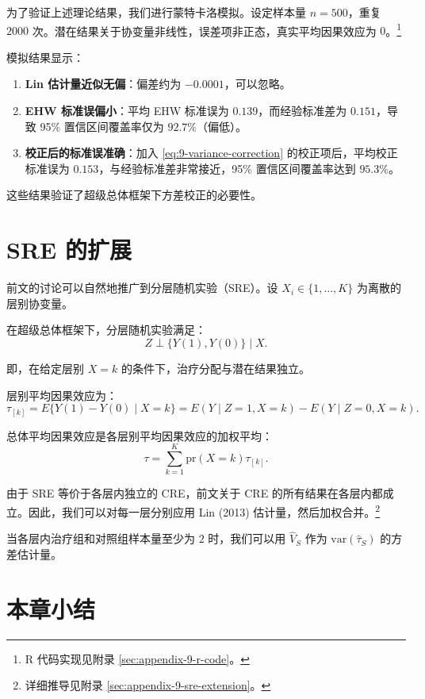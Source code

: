 为了验证上述理论结果，我们进行蒙特卡洛模拟。设定样本量 $n=500$，重复 $2000$ 次。潜在结果关于协变量非线性，误差项非正态，真实平均因果效应为 $0$。\footnote{R 代码实现见附录 \cref{sec:appendix-9-r-code}。}

模拟结果显示：
\begin{enumerate}
  \item \textbf{Lin 估计量近似无偏}：偏差约为 $-0.0001$，可以忽略。
  \item \textbf{EHW 标准误偏小}：平均 EHW 标准误为 $0.139$，而经验标准差为 $0.151$，导致 95\% 置信区间覆盖率仅为 $92.7\%$（偏低）。
  \item \textbf{校正后的标准误准确}：加入 \cref{eq:9-variance-correction} 的校正项后，平均校正标准误为 $0.153$，与经验标准差非常接近，95\% 置信区间覆盖率达到 $95.3\%$。
\end{enumerate}

这些结果验证了超级总体框架下方差校正的必要性。

\section{SRE 的扩展}\label{sec:9-sre-extension}

前文的讨论可以自然地推广到分层随机实验（SRE）。设 $X_i \in \{1, \dots, K\}$ 为离散的层别协变量。

\begin{Definition}\label{def:9-sre-superpop}
在超级总体框架下，分层随机实验满足：
\[
Z \perp \{Y(1), Y(0)\} \mid X.
\label{eq:9-sre-randomization}
\]
\end{Definition}

即，在给定层别 $X=k$ 的条件下，治疗分配与潜在结果独立。

层别平均因果效应为：
\[
\tau_{[k]} = E\{Y(1) - Y(0) \mid X=k\} = E(Y \mid Z=1, X=k) - E(Y \mid Z=0, X=k).
\label{eq:9-stratum-ace}
\]

总体平均因果效应是各层别平均因果效应的加权平均：
\[
\tau = \sum_{k=1}^K \mathrm{pr}(X=k) \tau_{[k]}.
\label{eq:9-total-ace-weighted}
\]

由于 SRE 等价于各层内独立的 CRE，前文关于 CRE 的所有结果在各层内都成立。因此，我们可以对每一层分别应用 Lin (2013) 估计量，然后加权合并。\footnote{详细推导见附录 \cref{sec:appendix-9-sre-extension}。}

当各层内治疗组和对照组样本量至少为 $2$ 时，我们可以用 $\hat{V}_S$ 作为 $\mathrm{var}(\hat{\tau}_S)$ 的方差估计量。

\section{本章小结}\label{sec:9-summary}

